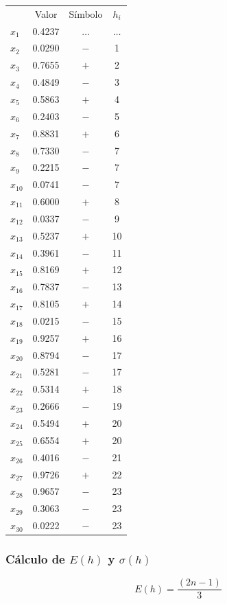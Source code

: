 \begin{tabular}{lccc}
  & Valor & Símbolo & $h_i$ \\
$x_1$  & 0.4237 & $\dots$ & $\dots$ \\
$x_2$  & 0.0290 & $-$ & 1 \\
$x_3$  & 0.7655 & $+$ & 2 \\
$x_4$  & 0.4849 & $-$ & 3 \\
$x_5$ & 0.5863 & $+$ & 4 \\
$x_6$ & 0.2403 & $-$ & 5 \\
$x_7$ & 0.8831 & $+$ & 6 \\
$x_8$ & 0.7330 & $-$ & 7 \\
$x_9$  & 0.2215 & $-$ & 7 \\
$x_{10}$ & 0.0741 & $-$ & 7 \\
$x_{11}$ & 0.6000 & $+$ & 8 \\
$x_{12}$ & 0.0337 & $-$ & 9 \\
$x_{13}$ & 0.5237 & $+$ & 10 \\
$x_{14}$ & 0.3961 & $-$ & 11 \\
$x_{15}$ & 0.8169 & $+$ & 12 \\
$x_{16}$ & 0.7837 & $-$ & 13 \\
$x_{17}$ & 0.8105 & $+$ & 14 \\
$x_{18}$ & 0.0215 & $-$ & 15 \\
$x_{19}$ & 0.9257 & $+$ & 16 \\
$x_{20}$ & 0.8794 & $-$ & 17 \\
$x_{21}$ & 0.5281 & $-$ & 17 \\
$x_{22}$ & 0.5314 & $+$ & 18 \\
$x_{23}$ & 0.2666 & $-$ & 19 \\
$x_{24}$ & 0.5494 & $+$ & 20 \\
$x_{25}$ & 0.6554 & $+$ & 20 \\
$x_{26}$ & 0.4016 & $-$ & 21 \\
$x_{27}$ & 0.9726 & $+$ & 22 \\
$x_{28}$ & 0.9657 & $-$ & 23 \\
$x_{29}$ & 0.3063 & $-$ & 23 \\
$x_{30}$ & 0.0222 & $-$ & 23 \\\hline
\end{tabular}

\subsubsection{Cálculo de $E(h)$ y $\sigma(h)$}
$$E(h) = \frac{(2n-1)}{3}$$


